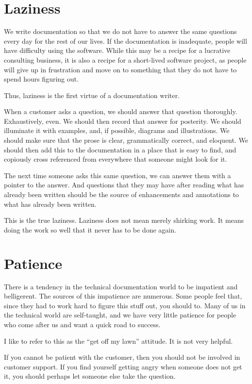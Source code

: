 \section*{Laziness}

We write documentation so that we do not have to answer the same questions every
day for the rest of our lives. If the documentation is inadequate, people will
have difficulty using the software. While this may be a recipe for a lucrative
consulting business, it is also a recipe for a short-lived software project, as
people will give up in frustration and move on to something that they do not
have to spend hours figuring out.

Thus, laziness is the first virtue of a documentation writer.

When a customer asks a question, we should answer that question thoroughly.
Exhaustively, even. We should then record that answer for posterity. We should
illuminate it with examples, and, if possible, diagrams and illustrations. We
should make sure that the prose is clear, grammatically correct, and eloquent.
We should then add this to the documentation in a place that is easy to find,
and copiously cross referenced from everywhere that someone might look for it.

The next time someone asks this same question, we can answer them with a pointer
to the answer. And questions that they may have after reading what has already
been written should be the source of enhancements and annotations to what has
already been written.

This is the true laziness. Laziness does not mean merely shirking work. It means
doing the work so well that it never has to be done again.

\section*{Patience}
There is a tendency in the technical documentation world to be impatient and
belligerent. The sources of this impatience are numerous. Some people feel that,
since they had to work hard to figure this stuff out, you should to. Many of us
in the technical world are self-taught, and we have very little patience for
people who come after us and want a quick road to success.

I like to refer to this as the ``get off my lawn'' attitude. It is not very
helpful.

If you cannot be patient with the customer, then you should not be involved in
customer support. If you find yourself getting angry when someone does not get
it, you should perhaps let someone else take the question.

